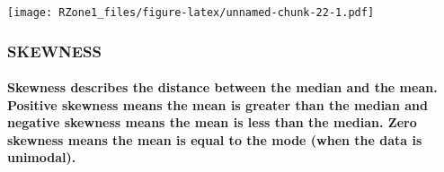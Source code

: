 \documentclass[11pt,]{article}
\newenvironment{Shaded}{\begin{snugshade}}{\end{snugshade}}
\newcommand{\CommentTok}[1]{\textcolor[rgb]{0.56,0.35,0.01}{\textit{#1}}}
\newcommand{\DataTypeTok}[1]{\textcolor[rgb]{0.13,0.29,0.53}{#1}}
\newcommand{\DecValTok}[1]{\textcolor[rgb]{0.00,0.00,0.81}{#1}}
\newcommand{\KeywordTok}[1]{\textcolor[rgb]{0.13,0.29,0.53}{\textbf{#1}}}
\newcommand{\NormalTok}[1]{#1}
\newcommand{\OperatorTok}[1]{\textcolor[rgb]{0.81,0.36,0.00}{\textbf{#1}}}
\newcommand{\StringTok}[1]{\textcolor[rgb]{0.31,0.60,0.02}{#1}}
\let\oldparagraph\paragraph
\renewcommand{\paragraph}[1]{\oldparagraph{#1}\mbox{}}
\begin{document}
\begin{Shaded}
\end{Shaded}

\texttt{[image: RZone1\_files/figure-latex/unnamed-chunk-22-1.pdf]}

\hypertarget{skewness}{%
\subsubsection{SKEWNESS}\label{skewness}}

\hypertarget{skewness-describes-the-distance-between-the-median-and-the-mean.-positive-skewness-means-the-mean-is-greater-than-the-median-and-negative-skewness-means-the-mean-is-less-than-the-median.-zero-skewness-means-the-mean-is-equal-to-the-mode-when-the-data-is-unimodal.}{%
\paragraph{Skewness describes the distance between the median and the
mean. Positive skewness means the mean is greater than the median and
negative skewness means the mean is less than the median. Zero skewness
means the mean is equal to the mode (when the data is
unimodal).}\label{skewness-describes-the-distance-between-the-median-and-the-mean.-positive-skewness-means-the-mean-is-greater-than-the-median-and-negative-skewness-means-the-mean-is-less-than-the-median.-zero-skewness-means-the-mean-is-equal-to-the-mode-when-the-data-is-unimodal.}}
\end{document}
